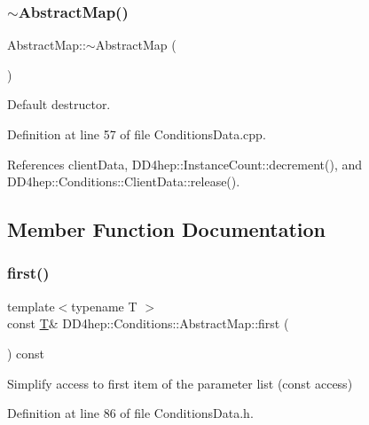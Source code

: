 \subsubsection{\texorpdfstring{$\sim$\+Abstract\+Map()}{~AbstractMap()}}
{\footnotesize\ttfamily Abstract\+Map\+::$\sim$\+Abstract\+Map (\begin{DoxyParamCaption}{ }\end{DoxyParamCaption})\hspace{0.3cm}{\ttfamily [virtual]}}



Default destructor. 



Definition at line 57 of file Conditions\+Data.\+cpp.



References client\+Data, D\+D4hep\+::\+Instance\+Count\+::decrement(), and D\+D4hep\+::\+Conditions\+::\+Client\+Data\+::release().



\subsection{Member Function Documentation}
\hypertarget{class_d_d4hep_1_1_conditions_1_1_abstract_map_aa07e99193c515602fccec5864f2c12bc}{}\label{class_d_d4hep_1_1_conditions_1_1_abstract_map_aa07e99193c515602fccec5864f2c12bc} 
\subsubsection{\texorpdfstring{first()}{first()}\hspace{0.1cm}{\footnotesize\ttfamily [1/2]}}
{\footnotesize\ttfamily template$<$typename T $>$ \\
const \hyperlink{class_t}{T}\& D\+D4hep\+::\+Conditions\+::\+Abstract\+Map\+::first (\begin{DoxyParamCaption}{ }\end{DoxyParamCaption}) const\hspace{0.3cm}{\ttfamily [inline]}}



Simplify access to first item of the parameter list (const access) 



Definition at line 86 of file Conditions\+Data.\+h.

